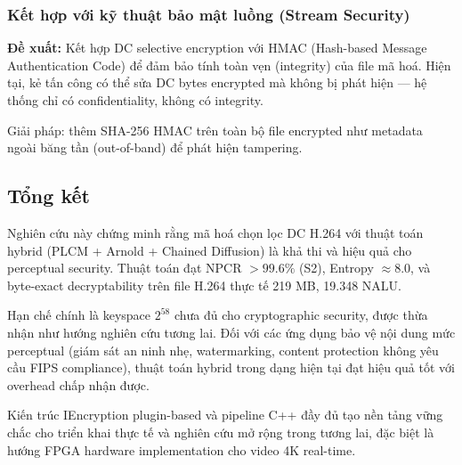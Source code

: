 \subsubsection{Kết hợp với kỹ thuật bảo mật luồng (Stream Security)}

\textbf{Đề xuất:} Kết hợp DC selective encryption với HMAC (Hash-based Message
Authentication Code) để đảm bảo tính toàn vẹn (integrity) của file mã hoá.
Hiện tại, kẻ tấn công có thể sửa DC bytes encrypted mà không bị phát hiện ---
hệ thống chỉ có confidentiality, không có integrity.

Giải pháp: thêm SHA-256 HMAC trên toàn bộ file encrypted như metadata ngoài băng tần
(out-of-band) để phát hiện tampering.

\subsection{Tổng kết}

Nghiên cứu này chứng minh rằng mã hoá chọn lọc DC H.264 với thuật toán hybrid
(PLCM + Arnold + Chained Diffusion) là khả thi và hiệu quả cho perceptual security.
Thuật toán đạt NPCR $> 99.6\%$ (S2), Entropy $\approx 8.0$, và byte-exact decryptability
trên file H.264 thực tế 219 MB, 19.348 NALU.

Hạn chế chính là keyspace $2^{58}$ chưa đủ cho cryptographic security, được thừa nhận
như hướng nghiên cứu tương lai. Đối với các ứng dụng bảo vệ nội dung mức perceptual
(giám sát an ninh nhẹ, watermarking, content protection không yêu cầu FIPS compliance),
thuật toán hybrid trong dạng hiện tại đạt hiệu quả tốt với overhead chấp nhận được.

Kiến trúc IEncryption plugin-based và pipeline C++ đầy đủ tạo nền tảng vững chắc
cho triển khai thực tế và nghiên cứu mở rộng trong tương lai, đặc biệt là hướng
FPGA hardware implementation cho video 4K real-time.
